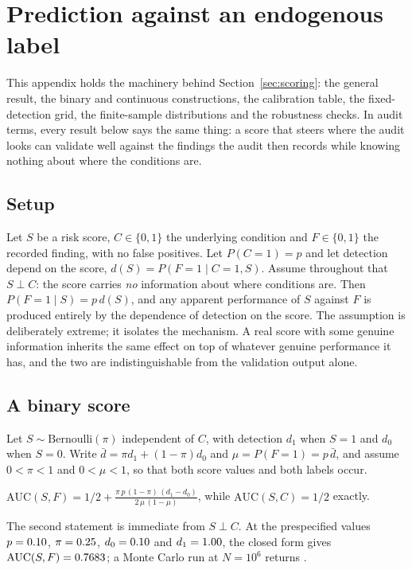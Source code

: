 \section{Prediction against an endogenous label}\label{app:pred}

This appendix holds the machinery behind Section~\ref{sec:scoring}: the
general result, the binary and continuous constructions, the calibration
table, the fixed-detection grid, the finite-sample distributions and the
robustness checks. In audit terms, every result below says the same thing:
a score that steers where the audit looks can validate well against the
findings the audit then records while knowing nothing about where the
conditions are.

\subsection{Setup}

Let $S$ be a risk score, $C \in \{0,1\}$ the underlying condition and
$F \in \{0,1\}$ the recorded finding, with no false positives. Let $P(C=1) = p$
and let detection depend on the score, $d(S) = P(F=1 \mid C=1, S)$. Assume
throughout that $S \perp C$: the score carries \emph{no} information about
where conditions are. Then $P(F=1 \mid S) = p\,d(S)$, and any apparent
performance of $S$ against $F$ is produced entirely by the dependence of
detection on the score. The assumption is deliberately extreme; it isolates
the mechanism. A real score with some genuine information inherits the same
effect on top of whatever genuine performance it has, and the two are
indistinguishable from the validation output alone.

\subsection{A binary score}

Let $S \sim \mathrm{Bernoulli}(\pi)$ independent of $C$, with detection $d_1$
when $S=1$ and $d_0$ when $S=0$. Write $\bar d = \pi d_1 + (1-\pi) d_0$ and
$\mu = P(F=1) = p\,\bar d$, and assume $0 < \pi < 1$ and $0 < \mu < 1$, so
that both score values and both labels occur.

\begin{proposition}\label{prop:aucbin}
$\displaystyle \mathrm{AUC}(S, F) = 1/2 +
\frac{\pi\,p\,(1-\pi)\,(d_1 - d_0)}{2\,\mu\,(1-\mu)}$, while
$\mathrm{AUC}(S, C) = 1/2$ exactly.
\end{proposition}

The second statement is immediate from $S \perp C$. At the prespecified values
$p = 0.10{}$, $\pi = 0.25{}$, $d_0 = 0.10{}$ and $d_1 = 1.00{}$,
the closed form gives $\mathrm{AUC}(S,F) = 0.7683{}$; a Monte Carlo run
at $N = 10^6$ returns \nBinAucMC{}.

